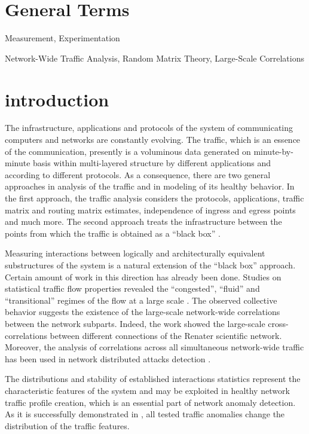 \documentclass{IEEEtran}
\begin{document}
\section*{General Terms}

Measurement, Experimentation

\begin{keywords}
Network-Wide Traffic Analysis, Random Matrix Theory, Large-Scale Correlations 
\end{keywords}

\section{introduction}

The infrastructure, applications and protocols of the system of communicating
computers and networks are constantly evolving. The traffic, which
is an essence of the communication, presently is a voluminous data
generated on minute-by-minute basis within multi-layered structure
by different applications and according to different protocols. As
a consequence, there are two general approaches in analysis of the
traffic and in modeling of its healthy behavior. In the first approach,
the traffic analysis considers the protocols, applications, traffic
matrix and routing matrix estimates, independence of ingress and egress
points and much more. The second approach treats the infrastructure
between the points from which the traffic is obtained as a {}``black
box'' \cite{Lau,Allen}. 

Measuring interactions between logically and architecturally equivalent
substructures of the system is a natural extension of the {}``black
box'' approach. Certain amount of work in this direction has already
been done. Studies on statistical traffic flow properties revealed
the {}``congested'', {}``fluid'' and {}``transitional'' regimes
of the flow at a large scale \cite{Fukuda,Ohira}. The observed collective
behavior suggests the existence of the large-scale network-wide correlations
between the network subparts. Indeed, the \cite{Barthelemy} work
showed the large-scale cross-correlations between different connections
of the Renater scientific network. Moreover, the analysis of correlations
across all simultaneous network-wide traffic has been used in network
distributed attacks detection \cite{LCD}. 

The distributions and stability of established interactions statistics
represent the characteristic features of the system and may be exploited
in healthy network traffic profile creation, which is an essential
part of network anomaly detection. As it is successfully demonstrated
in  \cite{Crovella}, all tested traffic anomalies change the distribution
of the traffic features. 
\end{document}
